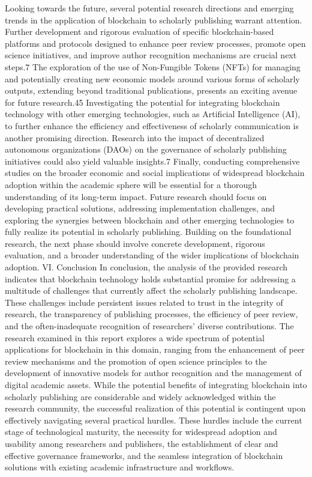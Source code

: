 \documentclass{article}
\begin{document}
Looking towards the future, several potential research directions and emerging trends in the application of blockchain to scholarly publishing warrant attention. Further development and rigorous evaluation of specific blockchain-based platforms and protocols designed to enhance peer review processes, promote open science initiatives, and improve author recognition mechanisms are crucial next steps.7 The exploration of the use of Non-Fungible Tokens (NFTs) for managing and potentially creating new economic models around various forms of scholarly outputs, extending beyond traditional publications, presents an exciting avenue for future research.45 Investigating the potential for integrating blockchain technology with other emerging technologies, such as Artificial Intelligence (AI), to further enhance the efficiency and effectiveness of scholarly communication is another promising direction. Research into the impact of decentralized autonomous organizations (DAOs) on the governance of scholarly publishing initiatives could also yield valuable insights.7 Finally, conducting comprehensive studies on the broader economic and social implications of widespread blockchain adoption within the academic sphere will be essential for a thorough understanding of its long-term impact. Future research should focus on developing practical solutions, addressing implementation challenges, and exploring the synergies between blockchain and other emerging technologies to fully realize its potential in scholarly publishing. Building on the foundational research, the next phase should involve concrete development, rigorous evaluation, and a broader understanding of the wider implications of blockchain adoption.
VI. Conclusion
In conclusion, the analysis of the provided research indicates that blockchain technology holds substantial promise for addressing a multitude of challenges that currently affect the scholarly publishing landscape. These challenges include persistent issues related to trust in the integrity of research, the transparency of publishing processes, the efficiency of peer review, and the often-inadequate recognition of researchers' diverse contributions. The research examined in this report explores a wide spectrum of potential applications for blockchain in this domain, ranging from the enhancement of peer review mechanisms and the promotion of open science principles to the development of innovative models for author recognition and the management of digital academic assets.
While the potential benefits of integrating blockchain into scholarly publishing are considerable and widely acknowledged within the research community, the successful realization of this potential is contingent upon effectively navigating several practical hurdles. These hurdles include the current stage of technological maturity, the necessity for widespread adoption and usability among researchers and publishers, the establishment of clear and effective governance frameworks, and the seamless integration of blockchain solutions with existing academic infrastructure and workflows.
\end{document}

